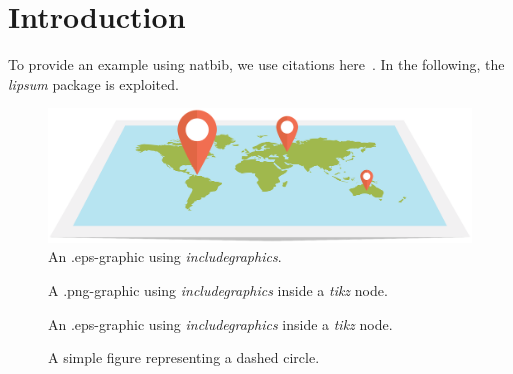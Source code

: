 \section{Introduction}
\label{sec:introduction}

To provide an example using natbib, we use citations here~\cite{Jackson,Moore}.
In the following, the \emph{lipsum} package is exploited.

\lipsum[1-4]

\begin{figure}
    \centering
    \includegraphics[width=0.4\columnwidth]{./figs/flatEarthEPS}
    \caption{An .eps-graphic using \emph{includegraphics}.}
    \label{fig:flatEarthEPS}
\end{figure}

\lipsum[5-6]

\begin{figure}
    \centering
    \caption{A .png-graphic using \emph{includegraphics} inside a \emph{tikz} node.}
 \label{fig:flatEarthPNGinTIKZ}
\end{figure}

\lipsum[7-10]

\begin{figure}
    \centering
    \caption{An .eps-graphic using \emph{includegraphics} inside a \emph{tikz} node.}
 \label{fig:flatEarthEPSinTIKZ}
\end{figure}

\lipsum[11]

\begin{figure}
    \centering
    
    \caption{A simple figure representing a dashed circle.}
    \label{fig:circleDashed}
\end{figure}

\lipsum[12]
